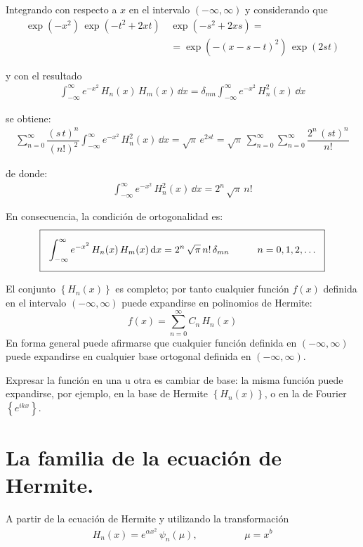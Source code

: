 Integrando con respecto a $x$ en el intervalo $(-\infty, \infty)$ y considerando que
\begin{align*}
\exp \left( -x^{2} \right) \, \exp \left( -t^{2} + 2 x t \right) \, &\exp \left( -s^{2} + 2 x s \right) = \\
&= \exp \left( - (x - s - t)^{2} \right) \, \exp \left( 2 s t \right)
\end{align*}

y con el resultado
\begin{align*}
\int_{-\infty}^{\infty} e^{-x^{2}} \, H_{n} (x) \, H_{m} (x) \, \dd{x} = \delta_{m n} \int_{-\infty}^{\infty} e^{-x^{2}} \, H_{n}^{2} (x) \, \dd{x}
\end{align*}

se obtiene:
\begin{align*}
\sum_{n=0}^{\infty} \dfrac{(s \, t)^{n}}{(n!)^{2}} \int_{-\infty}^{\infty} e^{-x^{2}} \, H_{n}^{2} (x) \, \dd{x} = \sqrt{\pi} \, e^{2 s t } = \sqrt{\pi} \, \sum_{n=0}^{\infty} \sum_{n=0}^{\infty} \dfrac{2^{n} \, (s t)^{n}}{n!}
\end{align*}

de donde:
\begin{align*}
\int_{-\infty}^{\infty} e^{-x^{2}} \, H_{n}^{2} (x) \, \dd{x} = 2^{n} \, \sqrt{\pi} \, n!
\end{align*}

En consecuencia, la condición de ortogonalidad es:
\begin{align}
\setlength{\fboxsep}{3\fboxsep}\boxed{ \int_{-\infty}^{\infty} e^{-x^{2}} \, H_{n} (x) \, H_{m} (x) \dd{x} = 2^{n} \, \sqrt{\pi} \, n! \, \delta_{m n} \hspace{1cm} n = 0, 1, 2, \ldots }
\end{align}

El conjunto $\left\{ H_{n }(x) \right\}$ es completo; por tanto cualquier función $f(x)$ definida en el intervalo $(-\infty, \infty)$ puede expandirse en polinomios de Hermite:
\[ f(x) = \sum_{n=0}^{\infty} C_{n} \, H_{n} (x) \]
En forma general puede afirmarse que cualquier función definida en $(-\infty, \infty)$ puede expandirse en cualquier base ortogonal definida en $(-\infty, \infty)$.
\par
Expresar la función en una u otra es cambiar de base: la misma función puede expandirse, por ejemplo, en la base de Hermite $\left\{ H_{n }(x) \right\}$, o en la de Fourier $\left\{ e^{i k x} \right\}$.

\section{La familia de la ecuación de Hermite.}
A partir de la ecuación de Hermite y utilizando la transformación
\begin{align*}
H_{n} (x) = e^{\alpha x^{2}} \, \psi_{n} (\mu), \hspace{2cm} \mu = x^{b}
\end{align*}

